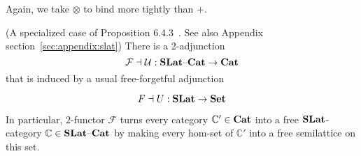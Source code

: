 Again, we take $\otimes$ to bind more tightly than $+$.


\begin{proposition}(A specialized case of Proposition 6.4.3~\cite{Borceux_1994}. See also Appendix section~\ref{sec:appendix:slat})
There is a 2-adjunction 
\vspace{-1mm}
\[
\mathcal{F} \dashv \mathcal{U} : \catname{SLat}\text{--}\catname{Cat} \to \catname{Cat}
\vspace{-1mm}
\]
that is induced by a usual free-forgetful adjunction 

\vspace{-1mm}
\[
F \dashv U : \catname{SLat} \to \catname{Set}
\vspace{-1mm}
\]
\end{proposition}
In particular, 2-functor $\mathcal{F}$ turns every category $\mathbb{C'} \in \mathbf{Cat}$ into a free $\mathbf{SLat}$-category $\mathbb{C} \in \mathbf{SLat}\text{--}\mathbf{Cat}$ by making every hom-set of $\mathbb{C'}$ into a free semilattice on this set.
